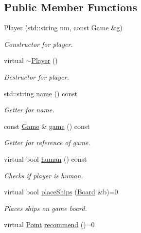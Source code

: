 \subsection*{Public Member Functions}
\begin{DoxyCompactItemize}
\item 
\mbox{\hyperlink{class_player_adebc0e1afa34a20c0be570f8e9e3a9bf}{Player}} (std\+::string nm, const \mbox{\hyperlink{class_game}{Game}} \&g)
\begin{DoxyCompactList}\small\item\em Constructor for player. \end{DoxyCompactList}\item 
virtual \mbox{\hyperlink{class_player_a8981c201ffb2270c0b6dbd467b627376}{$\sim$\+Player}} ()
\begin{DoxyCompactList}\small\item\em Destructor for player. \end{DoxyCompactList}\item 
std\+::string \mbox{\hyperlink{class_player_a422139ad63182cfc9f82305b87a3f9a5}{name}} () const
\begin{DoxyCompactList}\small\item\em Getter for name. \end{DoxyCompactList}\item 
const \mbox{\hyperlink{class_game}{Game}} \& \mbox{\hyperlink{class_player_ab4ef841709083fe60f6647ce0a7ca816}{game}} () const
\begin{DoxyCompactList}\small\item\em Getter for reference of game. \end{DoxyCompactList}\item 
virtual bool \mbox{\hyperlink{class_player_a47c5497b2d8bf5d745e85952d0bf097f}{human}} () const
\begin{DoxyCompactList}\small\item\em Checks if player is human. \end{DoxyCompactList}\item 
virtual bool \mbox{\hyperlink{class_player_ab89c1180c7314d3e19bcf4b2bed2e02a}{place\+Ships}} (\mbox{\hyperlink{class_board}{Board}} \&b)=0
\begin{DoxyCompactList}\small\item\em Places ships on game board. \end{DoxyCompactList}\item 
virtual \mbox{\hyperlink{class_point}{Point}} \mbox{\hyperlink{class_player_a2cc7a83d11158eafd8d49d4b9f23ce56}{recommend}} ()=0

\end{DoxyCompactItemize}
